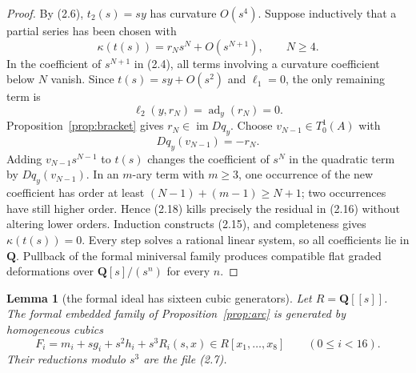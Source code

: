 \documentclass[11pt]{article}
\newtheorem{lemma}[theorem]{Lemma}
\theoremstyle{definition}
\theoremstyle{remark}
\newcommand{\QQ}{\mathbf Q}
\newcommand{\im}{\operatorname{im}}
\newcommand{\ad}{\operatorname{ad}}
\begin{document}
\begin{proof}
By (2.6), $t_2(s)=sy$ has curvature $O(s^4)$.  Suppose inductively that a
partial series has been chosen with
\[
 \kappa(t(s))=r_Ns^N+O(s^{N+1}),\qquad N\ge4.                  \tag{2.16}
\]
In the coefficient of $s^{N+1}$ in (2.4), all terms involving a curvature
coefficient below $N$ vanish.  Since $t(s)=sy+O(s^2)$ and $\ell_1=0$, the
only remaining term is
\[
 \ell_2(y,r_N)=\ad_y(r_N)=0.                                  \tag{2.17}
\]
Proposition~\ref{prop:bracket} gives $r_N\in\im Dq_y$.  Choose
$v_{N-1}\in T^1_0(A)$ with
\[
 Dq_y(v_{N-1})=-r_N.                                          \tag{2.18}
\]
Adding $v_{N-1}s^{N-1}$ to $t(s)$ changes the coefficient of $s^N$ in
the quadratic term by $Dq_y(v_{N-1})$.  In an $m$-ary term with $m\ge3$,
one occurrence of the new coefficient has order at least
$(N-1)+(m-1)\ge N+1$; two occurrences have still higher order.  Hence
(2.18) kills precisely the residual in (2.16) without altering lower orders.
Induction constructs (2.15), and completeness gives $\kappa(t(s))=0$.
Every step solves a rational linear system, so all coefficients lie in
$\QQ$.  Pullback of the formal miniversal family produces compatible flat
graded deformations over $\QQ[s]/(s^n)$ for every $n$.
\end{proof}

\begin{lemma}[the formal ideal has sixteen cubic generators]
\label{lem:cubics}
Let $R=\QQ[[s]]$.  The formal embedded family of
Proposition~\ref{prop:arc} is generated by homogeneous cubics
\[
 F_i=m_i+sg_i+s^2h_i+s^3R_i(s,x)\in
 R[x_1,\ldots,x_8]\qquad(0\le i<16).                         \tag{2.19}
\]
Their reductions modulo $s^3$ are the file (2.7).
\end{lemma}
\end{document}
